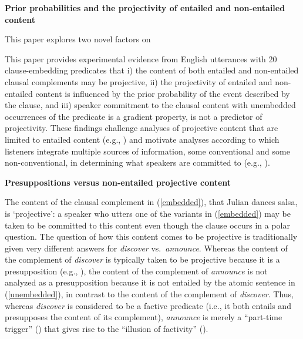 \documentclass[12pt,fleqn]{article}
\newcommand{\6}{\mbox{$[\hspace*{-.6mm}[$}}
\newcommand{\9}{\mbox{$]\hspace*{-.6mm}]$}}
\begin{document}
 
 
\begin{center}
{\large \bf Prior probabilities and the projectivity of entailed and non-entailed content}
\end{center}

This paper explores two novel factors on 

This paper provides experimental evidence from English utterances with 20 clause-embedding predicates that i) the content of both entailed and non-entailed clausal complements may be projective, ii) the projectivity of entailed and non-entailed content is influenced by the prior probability of the event described by the clause, and iii) speaker commitment to the clausal content with unembedded occurrences of the predicate is a gradient property, is not a predictor of projectivity. These findings challenge analyses of projective content that are limited to entailed content (e.g., \citealt{heim83,vds92}) and motivate analyses according to which listeners integrate multiple sources of information, some conventional and some non-conventional, in determining what speakers are committed to (e.g., \citealt{brst-salt10,brst-ar,abrusan2011,abrusan2016,tbd-variability}). 

{\bf Presuppositions versus non-entailed projective content} 

The content of the clausal complement in (\ref{embedded}), that Julian dances salsa, is `projective': a speaker who utters one of the variants in (\ref{embedded}) may be taken to be committed to this content even though the clause occurs in a polar question. The question of how this content comes to be projective is traditionally given very different answers for {\em discover} vs.\ {\em announce}. Whereas the content of the complement of {\em discover} is typically taken to be projective because it is a presupposition (e.g., \citealt{heim83,vds92}), the content of the complement of {\em announce} is not analyzed as a presupposition because it is not entailed by the atomic sentence in (\ref{unembedded}), in contrast to the content of the complement of {\em discover}. Thus, whereas {\em discover} is considered to be a factive predicate (i.e., it both entails and presupposes the content of its complement), {\em announce} is merely a ``part-time trigger'' (\citealt[139]{schlenker10}) that gives rise to the ``illusion of factivity'' (\citealt[76]{anand-hacquard2014}).
\end{document}
